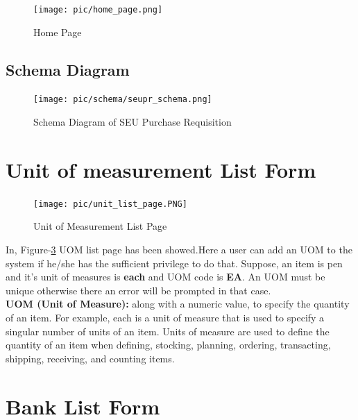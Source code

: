 \documentclass[12pt]{report} %
\begin{document}
\ifx
\clearpage

\begin{figure}[h]
	\texttt{[image: pic/home\_page.png]}
	\caption{Home Page}
	\label{fig:home_page}
\end{figure}



\begin{landscape}
\subsection{Schema Diagram}
\begin{figure}[h]
	\begin{center}
		\texttt{[image: pic/schema/seupr\_schema.png]}
	\end{center}
	\caption{Schema Diagram of SEU Purchase Requisition}
	\label{fig:context_level}
\end{figure}
\thispagestyle{empty} 
\end{landscape}
\clearpage
\fi

\section{Unit of measurement List Form}
\begin{figure}[h]
	\texttt{[image: pic/unit\_list\_page.PNG]}
	\caption{Unit of Measurement List Page}
	\label{fig:unit_list_page}
\end{figure}
In, Figure-\ref{fig:unit_list_page} UOM list page has been showed.Here a user can add an UOM to the system if he/she has the sufficient privilege to do that. Suppose, an item is pen and it's unit of measures is \textbf{each} and UOM code is \textbf{EA}.   An UOM must be unique otherwise there an error will be prompted in that case. \\

\textbf{UOM (Unit of Measure):} along with a numeric value, to specify
the quantity of an item. For example, each is a unit of measure that is used to specify a singular number of units of an item. Units of measure are used to define the quantity of an item when defining, stocking, planning, ordering, transacting, shipping, receiving, and counting items.\\



\section{Bank List Form}
\end{document}
